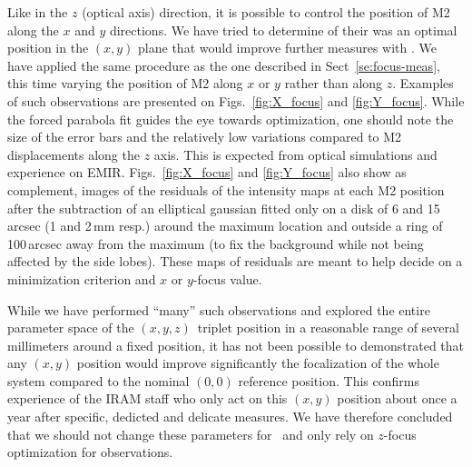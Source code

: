 Like in the $z$ (optical axis) direction, it is possible to control the position
of M2 along the $x$ and $y$ directions. We have tried to determine of their was
an optimal position in the $(x,y)$ plane that would improve further measures
with \nika. We have applied the same procedure as the one described in
Sect~\ref{se:focus-meas}, this time varying the position of M2 along $x$ or $y$
rather than along $z$. Examples of such observations are presented on
Figs.~\ref{fig:X_focus} and \ref{fig:Y_focus}. While the forced parabola fit
guides the eye towards optimization, one should note the size of the error bars
and the relatively low variations compared to M2 displacements along the $z$
axis. This is expected from optical simulations and experience on
EMIR. Figs.~\ref{fig:X_focus} and \ref{fig:Y_focus} also show as complement,
images of the residuals of the intensity maps at each M2 position after the
subtraction of an elliptical gaussian fitted only on a disk of 6 and 15\,arcsec
(1 and 2\,mm resp.) around the maximum location and outside a ring of 100\,arcsec
away from the maximum (to fix the background while not being affected by the
side lobes). These maps of residuals are meant to help decide on a minimization
criterion and $x$ or $y$-focus value.

While we have performed ``many'' such observations and explored the entire
parameter space of the $(x,y,z)$~triplet position in a reasonable range of
several millimeters around a fixed position, it has not been possible to
demonstrated that any $(x,y)$ position would improve significantly the
focalization of the whole system compared to the nominal $(0,0)$ reference
position. This confirms experience of the IRAM staff who only act on this
$(x,y)$ position about once a year after specific, dedicted and delicate
measures. We have therefore concluded that we should not change these parameters
for \nika\ and only rely on $z$-focus optimization for observations.

